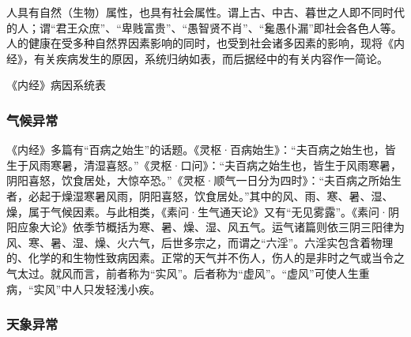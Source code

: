\documentclass[12pt]{ctexbook}
\begin{document}
人具有自然（生物）属性，也具有社会属性。谓上古、中古、暮世之人即不同时代的人；谓“君王众庶”、“卑贱富贵”、“愚智贤不肖”、“毚愚仆漏”即社会各色人等。人的健康在受多种自然界因素影响的同时，也受到社会诸多因素的影响，现将《内经》，有关疾病发生的原因，系统归纳如表，而后据经中的有关内容作一简论。

{
  \small\centerline{《内经》病因系统表}\smallskip
  \label{fig:《内经》病因系统表}
  \renewcommand{\baselinestretch}{1}
  \hspace{.1\textwidth}%
  \hfill
}

\subsubsection{气候异常}%

《内经》多篇有“百病之始生”的话题。《灵枢·百病始生》：“夫百病之始生也，皆生于风雨寒暑，清湿喜怒。”《灵枢·口问》：“夫百病之始生也，皆生于风雨寒暑，阴阳喜怒，饮食居处，大惊卒恐。”《灵枢·顺气一日分为四时》：“夫百病之所始生者，必起于燥湿寒暑风雨，阴阳喜怒，饮食居处。”其中的风、雨、寒、暑、湿、燥，属于气候因素。与此相类，《素问·生气通天论》又有“无见雾露”。《素问·阴阳应象大论》依季节概括为寒、暑、燥、湿、风五气。运气诸篇则依三阴三阳律为风、寒、暑、湿、燥、火六气，后世多宗之，而谓之“六淫”。六淫实包含着物理的、化学的和生物性致病因素。正常的天气并不伤人，伤人的是非时之气或当令之气太过。就风而言，前者称为“实风”。后者称为“虚风”。“虚风”可使人生重病，“实风”中人只发轻浅小疾。

\subsubsection{天象异常}%
\end{document}
